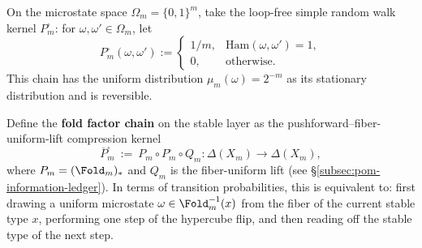 \begin{definition}\label{def:pom-fold-factor-chain}
On the microstate space \(\Omega_m=\{0,1\}^m\), take the loop-free simple random walk kernel \(P^{\square}_m\):
for \(\omega,\omega'\in\Omega_m\), let
\[
P^{\square}_m(\omega,\omega')
:=
\begin{cases}
1/m,& \mathrm{Ham}(\omega,\omega')=1,\\
0,& \text{otherwise}.
\end{cases}
\]
This chain has the uniform distribution \(\mu_m(\omega)=2^{-m}\) as its stationary distribution and is reversible.
\par
Define the \textbf{fold factor chain} on the stable layer as the pushforward--fiber-uniform-lift compression kernel
\[
\overline P^{\square}_m\ :=\ P_m\circ P^{\square}_m\circ Q_m:\Delta(X_m)\to\Delta(X_m),
\]
where \(P_m=(\Fold_m)_*\) and \(Q_m\) is the fiber-uniform lift (see \S\ref{subsec:pom-information-ledger}).
In terms of transition probabilities, this is equivalent to: first drawing a uniform microstate \(\omega\in\Fold_m^{-1}(x)\) from the fiber of the current stable type \(x\),
performing one step of the hypercube flip, and then reading off the stable type of the next step.
\end{definition}

